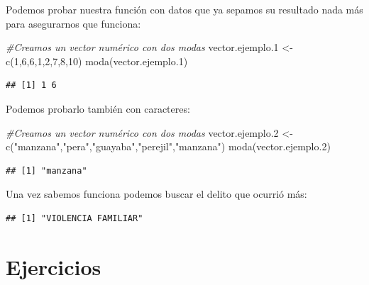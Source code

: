 \documentclass[
]{book}
\newenvironment{Shaded}{\begin{snugshade}}{\end{snugshade}}
\newcommand{\CommentTok}[1]{\textcolor[rgb]{0.56,0.35,0.01}{\textit{#1}}}
\newcommand{\DecValTok}[1]{\textcolor[rgb]{0.00,0.00,0.81}{#1}}
\newcommand{\FloatTok}[1]{\textcolor[rgb]{0.00,0.00,0.81}{#1}}
\newcommand{\FunctionTok}[1]{\textcolor[rgb]{0.00,0.00,0.00}{#1}}
\newcommand{\NormalTok}[1]{#1}
\newcommand{\OtherTok}[1]{\textcolor[rgb]{0.56,0.35,0.01}{#1}}
\newcommand{\SpecialCharTok}[1]{\textcolor[rgb]{0.00,0.00,0.00}{#1}}
\newcommand{\StringTok}[1]{\textcolor[rgb]{0.31,0.60,0.02}{#1}}
\begin{document}
Podemos probar nuestra función con datos que ya sepamos su resultado nada más para asegurarnos que funciona:

\begin{Shaded}
\begin{Highlighting}[]
\CommentTok{\#Creamos un vector numérico con dos modas}
\NormalTok{vector.ejemplo}\FloatTok{.1} \OtherTok{\textless{}{-}} \FunctionTok{c}\NormalTok{(}\DecValTok{1}\NormalTok{,}\DecValTok{6}\NormalTok{,}\DecValTok{6}\NormalTok{,}\DecValTok{1}\NormalTok{,}\DecValTok{2}\NormalTok{,}\DecValTok{7}\NormalTok{,}\DecValTok{8}\NormalTok{,}\DecValTok{10}\NormalTok{)}
\FunctionTok{moda}\NormalTok{(vector.ejemplo}\FloatTok{.1}\NormalTok{)}
\end{Highlighting}
\end{Shaded}

\begin{verbatim}
## [1] 1 6
\end{verbatim}

Podemos probarlo también con caracteres:

\begin{Shaded}
\begin{Highlighting}[]
\CommentTok{\#Creamos un vector numérico con dos modas}
\NormalTok{vector.ejemplo}\FloatTok{.2} \OtherTok{\textless{}{-}} \FunctionTok{c}\NormalTok{(}\StringTok{"manzana"}\NormalTok{,}\StringTok{"pera"}\NormalTok{,}\StringTok{"guayaba"}\NormalTok{,}\StringTok{"perejil"}\NormalTok{,}\StringTok{"manzana"}\NormalTok{)}
\FunctionTok{moda}\NormalTok{(vector.ejemplo}\FloatTok{.2}\NormalTok{)}
\end{Highlighting}
\end{Shaded}

\begin{verbatim}
## [1] "manzana"
\end{verbatim}

Una vez sabemos funciona podemos buscar el delito que ocurrió más:

\begin{Shaded}
\end{Shaded}

\begin{verbatim}
## [1] "VIOLENCIA FAMILIAR"
\end{verbatim}

\hypertarget{ejercicios}{%
\section{Ejercicios}\label{ejercicios}}
\end{document}
